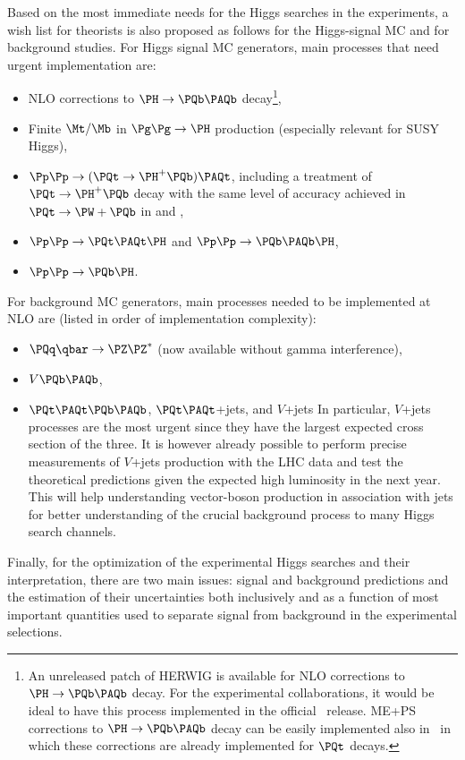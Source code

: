 Based on the most immediate needs for the Higgs searches in the experiments, 
a wish list for theorists is also proposed as follows for the Higgs-signal 
MC and for background studies.
For Higgs signal MC generators, main processes that need urgent implementation are:
\begin{itemize}	
\item NLO corrections to $\PH\to \PQb\PAQb$  decay\footnote{
  An unreleased patch of HERWIG is available for NLO corrections to 
$\PH\to \PQb\PAQb$  decay.  For the experimental collaborations,  it       
 would be ideal to have this process implemented in the official 
\herwigpp\ release.
ME+PS corrections to $\PH\to \PQb\PAQb$  decay can be easily implemented 
also in \sherpa\ in which these corrections are already implemented for 
$\PQt$ decays.},
\item Finite $\Mt/\Mb$ in $\Pg\Pg\to \PH$ production  (especially relevant 
for SUSY Higgs),
\item $\Pp\Pp\to (\PQt\to \PH^+ \PQb) \PAQt$, including a treatment of  
$\PQt \to \PH^+ \PQb$ decay
with the
same level of accuracy achieved in $\PQt\to \PW+ \PQb$ in \MCatNLO{} and 
\POWHEG{},
\item $\Pp\Pp\to \PQt\PAQt \PH$ and $\Pp\Pp\to \PQb\PAQb \PH$,
\item $\Pp\Pp\to \PQb\PH$. 
\end{itemize} 

For background MC generators, main processes needed to be implemented at NLO are (listed in order of implementation complexity):
\begin{itemize}
\item $\PQq\qbar \to \PZ\PZ^*$  (now available without gamma interference),
\item $V\PQb\PAQb$,
\item $\PQt\PAQt \PQb\PAQb$, $\PQt\PAQt$+jets, and $V$+jets
In particular, $V$+jets processes are the most urgent since they have the largest expected cross section of the three.
It is however already possible to perform precise measurements of $V$+jets production with 
the LHC data and test the theoretical predictions given the expected high luminosity in 
the next year.  This will help understanding vector-boson production in association 
with jets for better understanding of the crucial background process to many Higgs search channels.
\end{itemize} 

Finally, for the optimization of the experimental Higgs searches and their interpretation, 
there are two main issues: signal and background predictions and the estimation of their 
uncertainties both inclusively and as a function of most important quantities used to 
separate signal from background in the experimental selections. 

